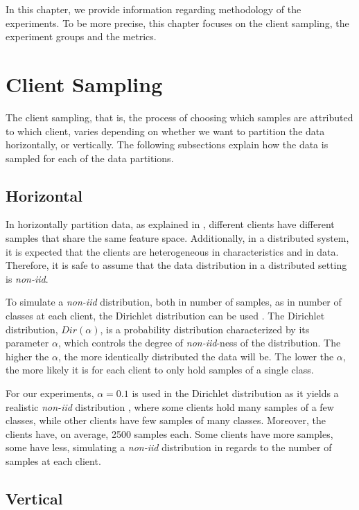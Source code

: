 In this chapter, we provide information regarding methodology of the experiments. To be more precise, this chapter focuses on the client sampling, the experiment groups and the metrics.

\section{Client Sampling}\label{meth:client_sampling}

The client sampling, that is, the process of choosing which samples are attributed to which client, varies depending on whether we want to partition the data horizontally, or vertically. The following subsections explain how the data is sampled for each of the data partitions.

\subsection{Horizontal}

In horizontally partition data, as explained in , different clients have different samples that share the same feature space. Additionally, in a distributed system, it is expected that the clients are heterogeneous in characteristics and in data. Therefore, it is safe to assume that the data distribution in a distributed setting is \textit{non-iid}.

To simulate a \textit{non-iid} distribution, both in number of samples, as in number of classes at each client, the Dirichlet distribution can be used \cite{tim, 10.48550/arxiv.2006.07242}. The Dirichlet distribution, $Dir(\alpha)$, is a probability distribution characterized by its parameter $\alpha$, which controls the degree of \textit{non-iid}-ness of the distribution. The higher the $\alpha$, the more identically distributed the data will be. The lower the $\alpha$, the more likely it is for each client to only hold samples of a single class.

For our experiments, $\alpha = 0.1$ is used in the Dirichlet distribution as it yields a realistic \textit{non-iid} distribution \cite{10.48550/arxiv.2006.07242}, where some clients hold many samples of a few classes, while other clients have few samples of many classes. Moreover, the clients have, on average, 2500 samples each. Some clients have more samples, some have less, simulating a \textit{non-iid} distribution in regards to the number of samples at each client.

\subsection{Vertical}\label{subsection:verticalpartitioning}

